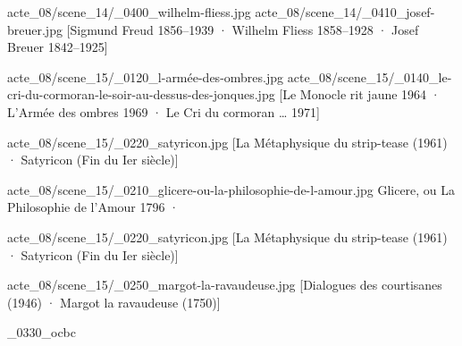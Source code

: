 
{acte_08/scene_14/_0400_wilhelm-fliess.jpg}
{acte_08/scene_14/_0410_josef-breuer.jpg}
[Sigmund Freud \textup{1856--1939} · Wilhelm Fliess \textup{1858--1928} · Josef Breuer \textup{1842--1925}]


{acte_08/scene_15/_0120_l-armée-des-ombres.jpg}
{acte_08/scene_15/_0140_le-cri-du-cormoran-le-soir-au-dessus-des-jonques.jpg}
[Le Monocle rit jaune \textup{1964} · L'Armée des ombres \textup{1969} · Le Cri du cormoran … \textup{1971}]


{acte_08/scene_15/_0220_satyricon.jpg}
[La Métaphysique du strip-tease \textup{(1961)} · Satyricon \textup{(Fin du Ier siècle)}]


{acte_08/scene_15/_0210_glicere-ou-la-philosophie-de-l-amour.jpg}
Glicere, ou La Philosophie de l'Amour \textup{1796} · 


{acte_08/scene_15/_0220_satyricon.jpg}
[La Métaphysique du strip-tease \textup{(1961)} · Satyricon \textup{(Fin du Ier siècle)}]

{acte_08/scene_15/_0250_margot-la-ravaudeuse.jpg}
[Dialogues des courtisanes \textup{(1946)} · Margot la ravaudeuse \textup{(1750)}]

_0330_ocbc



